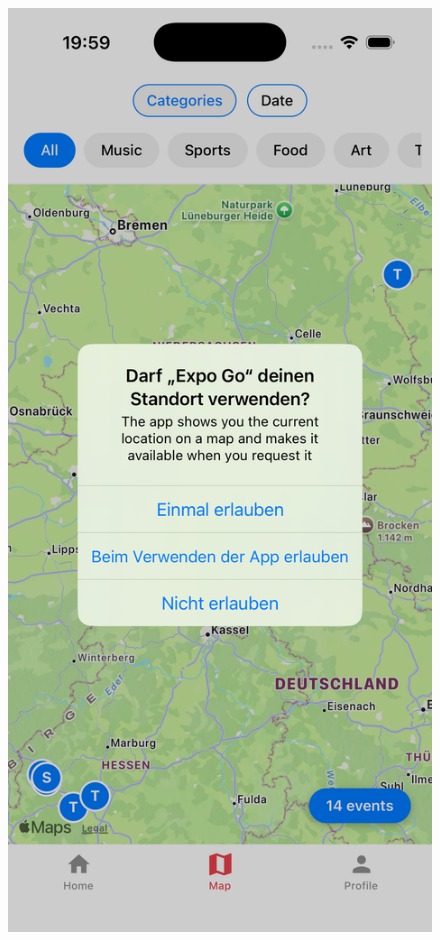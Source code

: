 \begin{figure}[htbp]
      \centering
      \vspace{1em}
      \begin{minipage}{0.48\textwidth}
            \centering
            \includegraphics[width=\textwidth]{images/copilot_screenshots/6. 1. Version das MapScreens - Screenshot-copilot.png}

\end{minipage}
\end{figure}
